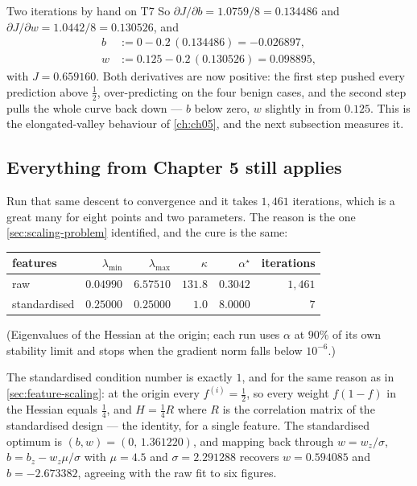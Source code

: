 \begin{workedexample}{Two iterations by hand on T7}
So $\partial J/\partial b = 1.0759/8 = 0.134486$ and
$\partial J/\partial w = 1.0442/8 = 0.130526$, and
\[
  \begin{aligned}
    b &:= 0 - 0.2\,(0.134486) = -0.026897,\\
    w &:= 0.125 - 0.2\,(0.130526) = 0.098895 ,
  \end{aligned}
\]
with $J = 0.659160$. Both derivatives are now positive: the first step pushed
every prediction above $\tfrac12$, over-predicting on the four benign cases, and
the second step pulls the whole curve back down --- $b$ below zero, $w$ slightly
in from $0.125$. This is the elongated-valley behaviour of \cref{ch:ch05}, and
the next subsection measures it.
\end{workedexample}

\subsection{Everything from Chapter 5 still applies}

Run that same descent to convergence and it takes $1{,}461$ iterations, which is
a great many for eight points and two parameters. The reason is the one
\cref{sec:scaling-problem} identified, and the cure is the same:

\begin{center}
\small
\renewcommand{\arraystretch}{1.2}
\begin{tabular}{@{}lrrrrr@{}}
\toprule
features & $\lambda_{\min}$ & $\lambda_{\max}$ & $\kappa$ & $\alpha^\star$
         & iterations\\
\midrule
raw           & $0.04990$ & $6.57510$ & $131.8$ & $0.3042$ & $1{,}461$\\
standardised  & $0.25000$ & $0.25000$ & $1.0$   & $8.0000$ & $7$\\
\bottomrule
\end{tabular}
\end{center}

(Eigenvalues of the Hessian at the origin; each run uses $\alpha$ at $90\%$ of
its own stability limit and stops when the gradient norm falls below $10^{-6}$.)

The standardised condition number is exactly $1$, and for the same reason as in
\cref{sec:feature-scaling}: at the origin every $f^{(i)} = \tfrac12$, so every
weight $f(1-f)$ in the Hessian equals $\tfrac14$, and $H = \tfrac14 R$ where $R$
is the correlation matrix of the standardised design --- the identity, for a
single feature. The standardised optimum is $(b,w) = (0,\,1.361220)$, and
mapping back through $w = w_z/\sigma$, $b = b_z - w_z\mu/\sigma$ with
$\mu = 4.5$ and $\sigma = 2.291288$ recovers $w = 0.594085$ and $b = -2.673382$,
agreeing with the raw fit to six figures.

